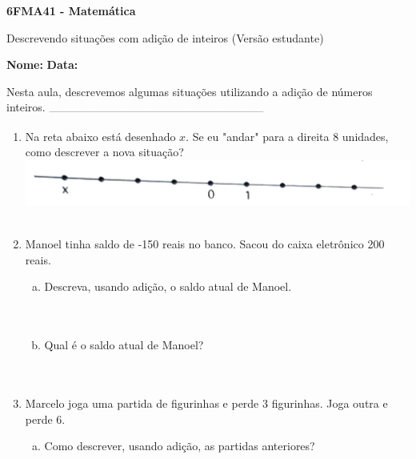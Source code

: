 \documentclass[a4paper,14pt]{article}
\begin{document}
	
	\noindent\textbf{6FMA41 - Matemática} 
	
	\begin{center}Descrevendo situações com adição de inteiros (Versão estudante)
	\end{center}
	
	\noindent\textbf{Nome:} \underline{\hspace{10cm}}
	\noindent\textbf{Data:} \underline{\hspace{4cm}}
	
	\begin{multicols}{2}
		\noindent Nesta aula, descrevemos algumas situações utilizando a adição de números inteiros.
	\textsubscript{---------------------------------------------------------------------}
    	\begin{enumerate}
    		\item Na reta abaixo está desenhado $x$. Se eu "andar" para a direita 8 unidades, como descrever a nova situação? \\
    		\includegraphics[width=1\linewidth]{6FMA41_imagens/imagem1} \\\\
    		\item Manoel tinha saldo de -150 reais no banco. Sacou do caixa eletrônico 200 reais.
    		\begin{enumerate}[a)]
    			\item Descreva, usando adição, o saldo atual de Manoel. \\\\\\
    			\item Qual é o saldo atual de Manoel? \\\\\\
    		\end{enumerate}
    		\item Marcelo joga uma partida de figurinhas e perde 3 figurinhas. Joga outra e perde 6.
    		\begin{enumerate}[a)]
    			\item Como descrever, usando adição, as partidas anteriores? \\\\

\end{enumerate}
\end{enumerate}
\end{multicols}
\end{document}

